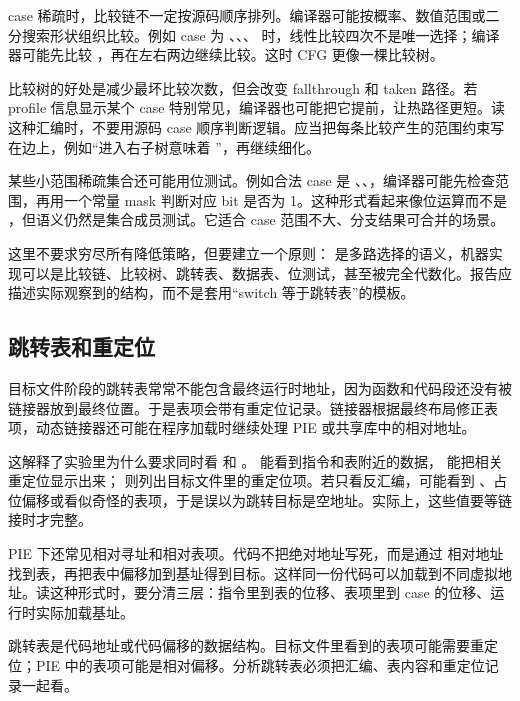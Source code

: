 case 稀疏时，比较链不一定按源码顺序排列。编译器可能按概率、数值范围或二分搜索形状组织比较。例如 case 为 、、、 时，线性比较四次不是唯一选择；编译器可能先比较 ，再在左右两边继续比较。这时 CFG 更像一棵比较树。

比较树的好处是减少最坏比较次数，但会改变 fallthrough 和 taken 路径。若 profile 信息显示某个 case 特别常见，编译器也可能把它提前，让热路径更短。读这种汇编时，不要用源码 case 顺序判断逻辑。应当把每条比较产生的范围约束写在边上，例如“进入右子树意味着 ”，再继续细化。

某些小范围稀疏集合还可能用位测试。例如合法 case 是 、、，编译器可能先检查范围，再用一个常量 mask 判断对应 bit 是否为 1。这种形式看起来像位运算而不是 ，但语义仍然是集合成员测试。它适合 case 范围不大、分支结果可合并的场景。

这里不要求穷尽所有降低策略，但要建立一个原则： 是多路选择的语义，机器实现可以是比较链、比较树、跳转表、数据表、位测试，甚至被完全代数化。报告应描述实际观察到的结构，而不是套用“switch 等于跳转表”的模板。

\subsection{跳转表和重定位}

目标文件阶段的跳转表常常不能包含最终运行时地址，因为函数和代码段还没有被链接器放到最终位置。于是表项会带有重定位记录。链接器根据最终布局修正表项，动态链接器还可能在程序加载时继续处理 PIE 或共享库中的相对地址。

这解释了实验里为什么要求同时看  和 。 能看到指令和表附近的数据， 能把相关重定位显示出来； 则列出目标文件里的重定位项。若只看反汇编，可能看到 、占位偏移或看似奇怪的表项，于是误以为跳转目标是空地址。实际上，这些值要等链接时才完整。

PIE 下还常见相对寻址和相对表项。代码不把绝对地址写死，而是通过  相对地址找到表，再把表中偏移加到基址得到目标。这样同一份代码可以加载到不同虚拟地址。读这种形式时，要分清三层：指令里到表的位移、表项里到 case 的位移、运行时实际加载基址。

\begin{keyidea}
跳转表是代码地址或代码偏移的数据结构。目标文件里看到的表项可能需要重定位；PIE 中的表项可能是相对偏移。分析跳转表必须把汇编、表内容和重定位记录一起看。
\end{keyidea}

